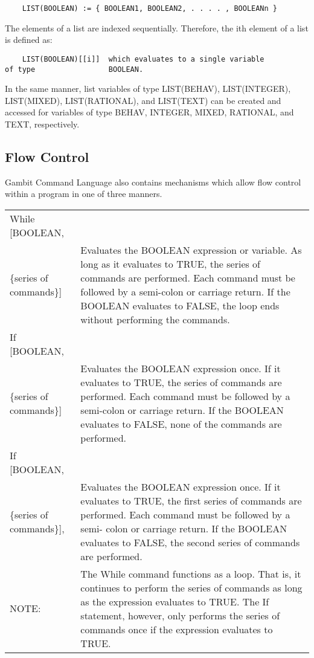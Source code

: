 \begin{verbatim}
	LIST(BOOLEAN) := { BOOLEAN1, BOOLEAN2, . . . . , BOOLEANn }
\end{verbatim}

The elements of a list are indexed sequentially.  Therefore, the ith
element of a list is defined as:

\begin{verbatim}
	LIST(BOOLEAN)[[i]]	which evaluates to a single variable
of type 				BOOLEAN.
\end{verbatim}

\noindent
In the same manner, list variables of type LIST(BEHAV), LIST(INTEGER),
LIST(MIXED), LIST(RATIONAL), and LIST(TEXT) can be created and
accessed for variables of type BEHAV, INTEGER, MIXED, RATIONAL, and
TEXT, respectively.

\subsection{Flow Control}

Gambit Command Language also contains mechanisms which allow flow
control within a program in one of three manners.

\medskip

\begin{tabular}{lp{4in}}
While [BOOLEAN, &\\
\{series of commands\}] & Evaluates the BOOLEAN
expression or variable.  As long as it evaluates to TRUE, the series
of commands are performed.  Each command must be followed by a
semi-colon or carriage return.  If the BOOLEAN evaluates to FALSE, the
loop ends without performing the commands.\\ If [BOOLEAN, & \\
\{series of commands\}] & Evaluates the BOOLEAN expression
once. If it evaluates to TRUE, the series of commands are performed.
Each command must be followed by a semi-colon or carriage return.  If
the BOOLEAN evaluates to FALSE, none of the commands are performed.\\
If [BOOLEAN, & \\
\{series of commands\}], & Evaluates the BOOLEAN expression
once. If it evaluates to TRUE, the first series of commands are
performed.  Each command must be followed by a semi- colon or carriage
return.  If the BOOLEAN evaluates to FALSE, the second series of
commands are performed. \\ NOTE: & The While command functions as a
loop.  That is, it continues to perform the series of commands as long
as the expression evaluates to TRUE.  The If statement, however, only
performs the series of commands once if the expression evaluates to
TRUE.
\end{tabular}

